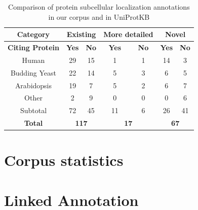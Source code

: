 \begin{table}
\centering
\begin{tabular}{|c|c|c|c|c|c|c|}
\hline
\textbf{Category} & \multicolumn{2}{c|}{\textbf{Existing}} & \multicolumn{2}{c|}{\textbf{More detailed}} & \multicolumn{2}{c|}{\textbf{Novel}} \\ 
\hline
\textbf{Citing Protein} & \textbf{Yes} & \textbf{No} & \textbf{Yes} & \textbf{No} & \textbf{Yes} & \textbf{No} \\
\hline
Human & 29 & 15 & 1 & 1 & 14 & 3 \\
Budding Yeast & 22 & 14 & 5 & 3 & 6 & 5 \\
Arabidopsis & 19 & 7 & 5 & 2 & 6 & 7 \\
Other & 2 & 9 & 0 & 0 & 0 & 6 \\
\hline
Subtotal & 72 & 45 & 11 & 6 & 26 & 41 \\
\hline
\textbf{Total} & \multicolumn{2}{c|}{\textbf{117}} & \multicolumn{2}{c|}{\textbf{17}} & \multicolumn{2}{c|}{\textbf{67}} \\ 
 \hline
\end{tabular}
\caption{Comparison of protein subcellular localization annotations in our corpus
and in UniProtKB}\label{tab:novelAnnotation}
\end{table}

\section{Corpus statistics}


\section{Linked Annotation}

